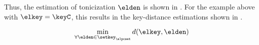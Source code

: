 Thus, the estimation of tonicization $\elden$ is shown in
. For the example above with
$\elkey = \keyC$, this results in the key-distance
estimations shown in
.

\begin{equation}
    \label{eq:tonicization_estimation}
    \min_{\forall \elden \in \setkey_\elpcset} d(\elkey, \elden)
\end{equation}







